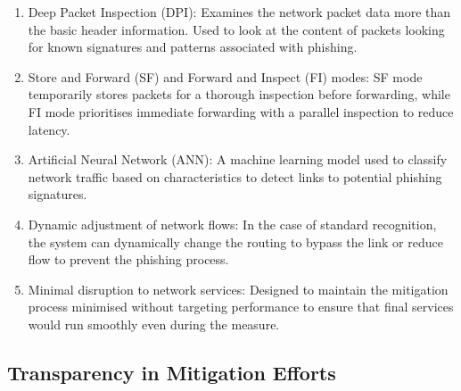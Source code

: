 \begin{enumerate}
    \item Deep Packet Inspection (DPI): Examines the network packet data more than the basic header information. Used to look at the content of packets looking for known signatures and patterns associated with phishing.
    \item Store and Forward (SF) and Forward and Inspect (FI) modes: SF mode temporarily stores packets for a thorough inspection before forwarding, while FI mode prioritises immediate forwarding with a parallel inspection to reduce latency.
    \item Artificial Neural Network (ANN): A machine learning model used to classify network traffic based on characteristics to detect links to potential phishing signatures.
    \item Dynamic adjustment of network flows: In the case of standard recognition, the system can dynamically change the routing to bypass the link or reduce flow to prevent the phishing process.
    \item Minimal disruption to network services: Designed to maintain the mitigation process minimised without targeting performance to ensure that final services would run smoothly even during the measure.
\end{enumerate}

\subsection{Transparency in Mitigation Efforts}

